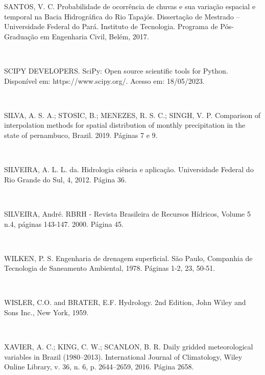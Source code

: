 \begin{flushleft}
SANTOS, V. C. Probabilidade de ocorrência de chuvas e sua variação espacial e temporal na Bacia Hidrográfica do Rio Tapajós. Dissertação de Mestrado – Universidade Federal do Pará. Instituto de Tecnologia. Programa de Pós-Graduação em Engenharia Civil, Belém, 2017.

\

SCIPY DEVELOPERS. SciPy: Open source scientific tools for Python. Disponível em: https://www.scipy.org/. Acesso em: 18/05/2023.

\

SILVA, A. S. A.; STOSIC, B.; MENEZES, R. S. C.; SINGH, V. P. Comparison of interpolation methods for spatial distribution of monthly precipitation in the state of pernambuco, Brazil. 2019. Páginas 7 e 9.

\

SILVEIRA, A. L. L. da. Hidrologia ciência e aplicação. Universidade Federal do Rio Grande do Sul, 4, 2012. Página 36.

\

SILVEIRA, André. RBRH - Revista Brasileira de Recursos Hídricos, Volume 5 n.4, páginas 143-147. 2000. Página 45.

\

WILKEN, P. S. Engenharia de drenagem superficial. São Paulo, Companhia de Tecnologia de Saneamento Ambiental, 1978. Páginas 1-2, 23, 50-51.

\

WISLER, C.O. and BRATER, E.F. Hydrology. 2nd Edition, John Wiley and Sons Inc., New York, 1959.

\

XAVIER, A. C.; KING, C. W.; SCANLON, B. R. Daily gridded meteorological variables in Brazil (1980–2013). International Journal of Climatology, Wiley Online Library, v. 36, n. 6, p. 2644–2659, 2016. Página 2658.
\end{flushleft}